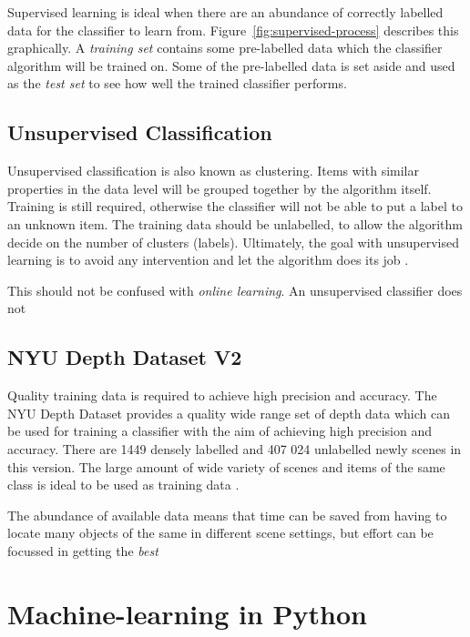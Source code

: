 \documentclass[11pt,openright,a4paper]{report}
\begin{document}
Supervised learning is ideal when there are an abundance of correctly labelled data for the classifier to learn from. Figure~\ref{fig:supervised-process} describes this graphically. A \textit{training set} contains some pre-labelled data which the classifier algorithm will be trained on. Some of the pre-labelled data is set aside and used as the \textit{test set} to see how well the trained classifier performs. 


\subsection{Unsupervised Classification}
Unsupervised classification is also known as clustering. Items with similar properties in the data level will be grouped together by the algorithm itself. Training is still required, otherwise the classifier will not be able to put a label to an unknown item. The training data should be unlabelled, to allow the algorithm decide on the number of clusters (labels). Ultimately, the goal with unsupervised learning is to avoid any intervention and let the algorithm does its job \cite{hall-notes}. 

This should not be confused with \textit{online learning}. An unsupervised classifier does not 

\subsection{NYU Depth Dataset V2}
Quality training data is required to achieve high precision and accuracy. The NYU Depth Dataset provides a quality wide range set of depth data which can be used for training a classifier with the aim of achieving high precision and accuracy. There are 1449 densely labelled and 407 024 unlabelled newly scenes in this version. The large amount of wide variety of scenes and items of the same class is ideal to be used as training data \cite{nyu-dataset}.

The abundance of available data means that time can be saved from having to locate many objects of the same in different scene settings, but effort can be focussed in getting the \textit{best} 


\section{Machine-learning in Python}
\end{document}
